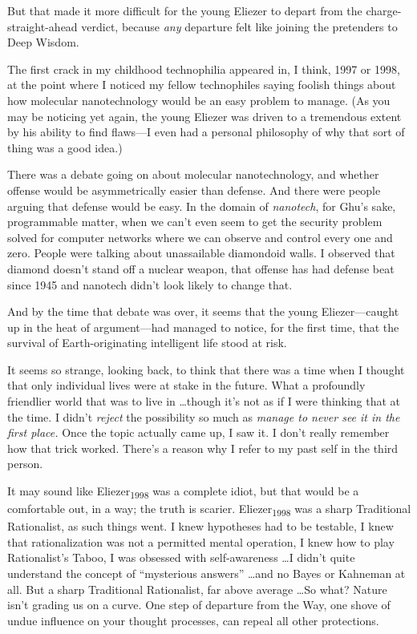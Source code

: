 {
 But that made it more difficult for the young Eliezer to depart
from the charge-straight-ahead verdict, because \textit{any} departure
felt like joining the pretenders to Deep Wisdom.}

{
 The first crack in my childhood technophilia appeared in, I think,
1997 or 1998, at the point where I noticed my fellow technophiles
saying foolish things about how molecular nanotechnology would be an
easy problem to manage. (As you may be noticing yet again, the young
Eliezer was driven to a tremendous extent by his ability to find
flaws---I even had a personal philosophy of why that sort of thing was
a good idea.)}

{
 There was a debate going on about molecular nanotechnology, and
whether offense would be asymmetrically easier than defense. And there
were people arguing that defense would be easy. In the domain of
\textit{nanotech}, for Ghu's sake, programmable matter,
when we can't even seem to get the security problem
solved for computer networks where we can observe and control every one
and zero. People were talking about unassailable diamondoid walls. I
observed that diamond doesn't stand off a nuclear
weapon, that offense has had defense beat since 1945 and nanotech
didn't look likely to change that.}

{
 And by the time that debate was over, it seems that the young
Eliezer---caught up in the heat of argument---had managed to notice,
for the first time, that the survival of Earth-originating intelligent
life stood at risk.}

{
 It seems so strange, looking back, to think that there was a time
when I thought that only individual lives were at stake in the future.
What a profoundly friendlier world that was to live in \ldots though
it's not as if I were thinking that at the time. I
didn't \textit{reject} the possibility so much as
\textit{manage to never see it in the first place.} Once the topic
actually came up, I saw it. I don't really remember how
that trick worked. There's a reason why I refer to my
past self in the third person.}

{
 It may sound like Eliezer\textsubscript{1998} was a complete
idiot, but that would be a comfortable out, in a way; the truth is
scarier. Eliezer\textsubscript{1998} was a sharp Traditional
Rationalist, as such things went. I knew hypotheses had to be testable,
I knew that rationalization was not a permitted mental operation, I
knew how to play Rationalist's Taboo, I was obsessed
with self-awareness \ldots I didn't quite understand the
concept of ``mysterious answers''
\ldots and no Bayes or Kahneman at all. But a sharp Traditional
Rationalist, far above average \ldots So what? Nature
isn't grading us on a curve. One step of departure from
the Way, one shove of undue influence on your thought processes, can
repeal all other protections.}

